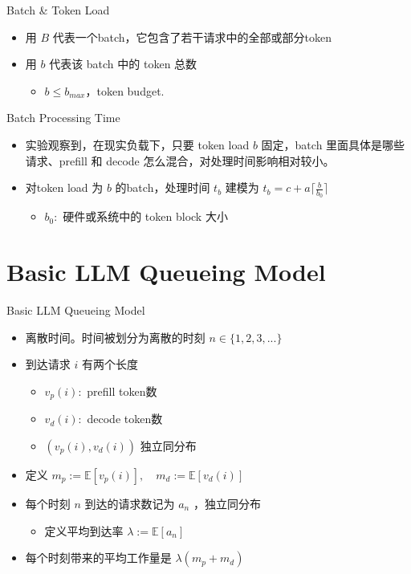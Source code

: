 \documentclass{beamer}
\begin{document}
\begin{frame}{Batch \& Token Load}
    \begin{itemize}[<+-| alert@+>] 
        \item 用 $B$ 代表一个batch，它包含了若干请求中的全部或部分token
        \item 用 $b$ 代表该 batch 中的 token 总数
        \begin{itemize}
            \item $b\le b_{max}$，token budget.
        \end{itemize}
    \end{itemize}
\end{frame}

\begin{frame}{Batch Processing Time}
    \begin{itemize}[<+-| alert@+>] 
        \item 实验观察到，在现实负载下，只要 token load $b$ 固定，batch 里面具体是哪些请求、prefill 和 decode 怎么混合，对处理时间影响相对较小。
        \item 对token load 为 $b$ 的batch，处理时间 $t_b$ 建模为 $t_b = c + a\lceil \frac{b}{b_0}\rceil$
        \begin{itemize}
            \item $b_0:$ 硬件或系统中的 token block 大小
        \end{itemize}
    \end{itemize}
\end{frame}

\section{Basic LLM Queueing Model}
\begin{frame}{Basic LLM Queueing Model}
    \begin{itemize}[<+-| alert@+>] 
        \item 离散时间。时间被划分为离散的时刻 $n\in \{1,2,3,...\}$ 
        \item 到达请求 $i$ 有两个长度
        \begin{itemize}
            \item $v_p(i): $ prefill token数
            \item $v_d(i): $ decode token数
            \item $(v_p(i),v_d(i))$ 独立同分布
        \end{itemize}
        \item 定义 $m_p:=\mathbb{E}[v_p(i)],\quad m_d:=\mathbb{E}[v_d(i)]$ 
        \item 每个时刻 $n$ 到达的请求数记为 $a_n$ ，独立同分布
            \begin{itemize}
                \item 定义平均到达率 $\lambda :=\mathbb{E}[a_n]$ 
            \end{itemize}
        \item 每个时刻带来的平均工作量是 $\lambda (m_p+m_d)$ 
    \end{itemize}
\end{frame}
\end{document}
